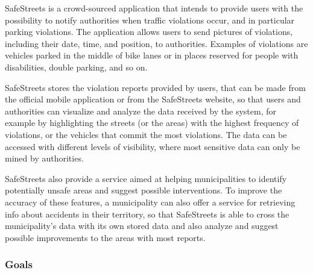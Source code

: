 SafeStreets is a crowd-sourced application that intends to provide users with the possibility to notify authorities when traffic violations occur, and in particular parking violations. The application allows users to send pictures of violations, including their date, time, and position, to authorities. Examples of violations are vehicles parked in the middle of bike lanes or in places reserved for people with disabilities, double parking, and so on.

SafeStreets stores the violation reports provided by users, that can be made from the official mobile application or from the SafeStreets website, so that users and authorities can visualize and analyze the data received by the system, for example by highlighting the streets (or the areas) with the highest frequency of violations, or the vehicles that commit the most violations. The data can be accessed with different levels of visibility, where most sensitive data can only be mined by authorities.

SafeStreets also provide a service aimed at helping municipalities to identify potentially unsafe areas and suggest possible interventions. To improve the accuracy of these features, a municipality can also offer a service for retrieving info about accidents in their territory, so that SafeStreets is able to cross the municipality's data with its own stored data and also analyze and suggest possible improvements to the areas with most reports.
\subsubsection{Goals}
\begin{enumerate}[label={G\arabic*.}]
     \label{G_report_auth}
     \label{G_store_cross_data}
     \label{G_interventions}
     \label{G_inst_registration}
     \label{G_visualization}
    \begin{enumerate}[label={G\arabic{enumi}.\arabic*.}]
    	 \label{G_visualization_cit}
    	 \label{G_visualization_auth}
    \end{enumerate}
	 \label{G_accept_reports}
	 \label{G_check_info}
\end{enumerate}
